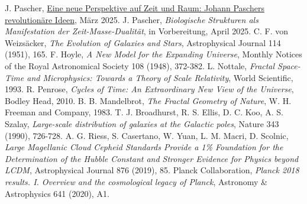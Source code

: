 \documentclass[12pt,a4paper]{article}
\begin{document}
\begin{thebibliography}{99}
		 J. Pascher, \href{https://github.com/jpascher/T0-Time-Mass-Duality/tree/main/2/pdf/Deutsch/ZeitRaumPascher.pdf}{Eine neue Perspektive auf Zeit und Raum: Johann Paschers revolutionäre Ideen}, März 2025.
		 J. Pascher, \textit{Biologische Strukturen als Manifestation der Zeit-Masse-Dualität}, in Vorbereitung, April 2025.
		 C. F. von Weizsäcker, \textit{The Evolution of Galaxies and Stars}, Astrophysical Journal 114 (1951), 165.
		 F. Hoyle, \textit{A New Model for the Expanding Universe}, Monthly Notices of the Royal Astronomical Society 108 (1948), 372-382.
		 L. Nottale, \textit{Fractal Space-Time and Microphysics: Towards a Theory of Scale Relativity}, World Scientific, 1993.
		 R. Penrose, \textit{Cycles of Time: An Extraordinary New View of the Universe}, Bodley Head, 2010.
		 B. B. Mandelbrot, \textit{The Fractal Geometry of Nature}, W. H. Freeman and Company, 1983.
		 T. J. Broadhurst, R. S. Ellis, D. C. Koo, A. S. Szalay, \textit{Large-scale distribution of galaxies at the Galactic poles}, Nature 343 (1990), 726-728.
		 A. G. Riess, S. Casertano, W. Yuan, L. M. Macri, D. Scolnic, \textit{Large Magellanic Cloud Cepheid Standards Provide a 1\% Foundation for the Determination of the Hubble Constant and Stronger Evidence for Physics beyond LCDM}, Astrophysical Journal 876 (2019), 85.
		 Planck Collaboration, \textit{Planck 2018 results. I. Overview and the cosmological legacy of Planck}, Astronomy \& Astrophysics 641 (2020), A1.
		
	\end{thebibliography}
	
\end{document}
